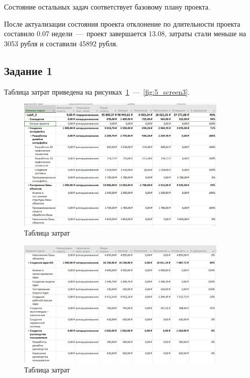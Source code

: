 Состояние остальных задач соответствует базовому плану проекта.

После актуализации состояния проекта отклонение по длительности проекта составило 0.07 недели~---~проект завершается 13.08, затраты стали меньше на 3053 рубля и составили 45892 рубля.

\subsection{Задание 1}

Таблица затрат приведена на рисунках~\ref{fig:5_screen1}~---~\ref{fig:5_screen3}.

\begin{figure}[H]
	\centering
	\includegraphics[width=0.9\textwidth]{img/lab5/screen1_1.jpg}
	\caption{Таблица затрат}
	\label{fig:5_screen1}
\end{figure}

\begin{figure}[H]
	\centering
	\includegraphics[width=0.9\textwidth]{img/lab5/screen1_2.jpg}
	\caption{Таблица затрат}
	\label{fig:5_screen2}
\end{figure}

